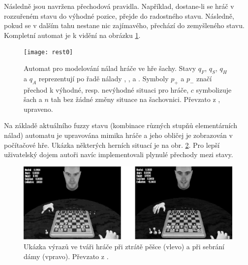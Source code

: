 \documentclass[a4paper,10pt]{article}
\begin{document}
Následně jsou navržena přechodová pravidla. Například, dostane-li se hráč v rozzuřeném stavu do výhodné pozice, přejde do radostného stavu.  Následně, pokud se v dalším tahu nestane nic zajímavého, přechází do zemyšleného stavu. Kompletní automat je k vidění na obrázku \ref{img:ChessEmosFA}.

\begin{figure}
 \centering
 \texttt{[image: rest0]}
 
 \caption{Automat pro modelování nálad hráče ve hře šachy. Stavy $q_F$, $q_S$, $q_H$ a $q_A$ reprezentují po řadě nálady , ,  a . Symboly $p_{+}$ a $p_{-}$ značí přechod k výhodné, resp. nevýhodné situaci pro hráče, $c$ symbolizuje šach a $n$ tah bez žádné změny situace na šachovnici. Převzato z \cite{AlvJoaCru-FuStMaAppEmoModEleGamCha}, upraveno.}
 \label{img:ChessEmosFA}
\end{figure}

Na základě aktuálního fuzzy stavu (kombinace různých stupňů elementárních nálad) automatu je upravována mimika hráče a jeho obličej je zobrazován v počítačové hře. Ukázka některých herních situací je na obr. \ref{img:ChessEmosScreens}. Pro lepší uživatelský dojem autoři navíc implementovali plynulé přechody mezi stavy.

\begin{figure}
 \centering
 \includegraphics[width=\textwidth]{chess-emos-screens}
 
 \caption{Ukázka výrazů ve tváři hráče při ztrátě pěšce (vlevo) a při sebrání dámy (vpravo). Převzato z \cite{AlvJoaCru-FuStMaAppEmoModEleGamCha}.} \label{img:ChessEmosScreens}
\end{figure}

\end{document}
